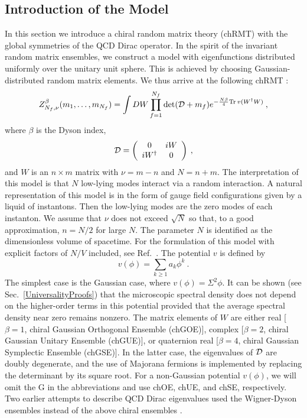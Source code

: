 \subsection{Introduction of the Model}

In this section we introduce a chiral random matrix theory
(chRMT) with the global symmetries of the QCD Dirac operator.  In the
spirit of the invariant random matrix ensembles, we construct a model
with eigenfunctions distributed uniformly over the unitary unit
sphere. This is achieved by choosing Gaussian-distributed random
matrix elements. We thus arrive at the following chRMT
\cite{Shur93,Verb94a}:
\begin{equation}
  Z_{N_f,\nu}^\beta(m_1,\ldots, m_{N_f}) = 
  \int DW \prod_{f= 1}^{N_f} \det({\cal D} +m_f)
  e^{-\frac{N \beta}4 {\rm Tr\:} v(W^\dagger W)}\:,
\label{zrandom1}
\end{equation}
where $\beta$ is the Dyson index,
\begin{equation}
  {\cal D} = \left (\begin{array}{cc} 0 & iW\\
      iW^\dagger & 0 \end{array} \right )\:,
\end{equation}
and $W$ is an $n\times m$ matrix with $\nu = m-n$ and $N= n+m$. The
interpretation of this model is that $N$ low-lying modes interact via
a random interaction. A natural representation of this model is in the
form of gauge field configurations given by a liquid of instantons.
Then the low-lying modes are the zero modes of each instanton.  We
assume that $\nu$ does not exceed $\sqrt N$ so that, to a good
approximation, $n = N/2$ for large $N$. The parameter $N$ is
identified as the dimensionless volume of spacetime. For the
formulation of this model with explicit factors of $N/V$ included, see
Ref.~\cite{smilran}. The potential $v$ is defined by
\begin{equation}
  v(\phi) = \sum_{k\ge 1} a_k \phi^k\:.
\end{equation}
The simplest case is the Gaussian case, where $v(\phi) = \Sigma^2\phi$.
It can be shown (see Sec.~\ref{UniversalityProofs}) that the
microscopic spectral density does not depend on the higher-order terms
in this potential provided that the average spectral density near zero
remains nonzero.  The matrix elements of $W$ are either real [$\beta =
1$, chiral Gaussian Orthogonal Ensemble (chGOE)], complex [$\beta =
2$, chiral Gaussian Unitary Ensemble (chGUE)], or quaternion real
[$\beta = 4$, chiral Gaussian Symplectic Ensemble (chGSE)]. In the
latter case, the eigenvalues of ${\cal D}$ are doubly degenerate, and
the use of Majorana fermions is implemented by replacing the
determinant by its square root.  For a non-Gaussian potential
$v(\phi)$, we will omit the G in the abbreviations and use chOE, chUE,
and chSE, respectively.  Two earlier
attempts to describe QCD Dirac eigenvalues used the Wigner-Dyson
ensembles instead of the above chiral ensembles \cite{early}.

